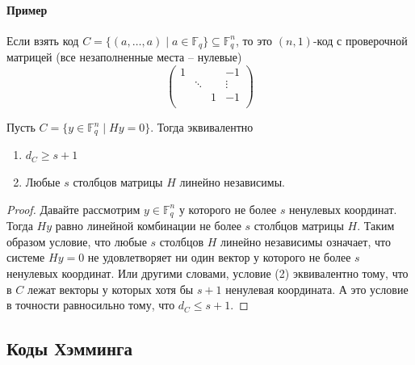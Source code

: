\paragraph{Пример}

Если взять код $C = \{(a, \ldots, a) \mid a\in \mathbb F_q\}\subseteq \mathbb F_q^n$, то это $(n, 1)$-код с проверочной матрицей (все незаполненные места -- нулевые)
\[
\begin{pmatrix}
{1}&{}&{}&{-1}\\
{}&{\ddots}&{}&{\vdots}\\
{}&{}&{1}&{-1}\\
\end{pmatrix}
\]

\begin{claim}
\label{claim::LinearCodeMinDistInTermOfMatrix}
Пусть $C = \{y\in \mathbb F_q^n\mid Hy = 0\}$.
Тогда эквивалентно
\begin{enumerate}
\item $d_C \geqslant s + 1$

\item Любые $s$ столбцов матрицы $H$ линейно независимы.
\end{enumerate}
\end{claim}
\begin{proof}
Давайте рассмотрим $y\in \mathbb F_q^n$ у которого не более $s$ ненулевых координат.
Тогда $Hy$ равно линейной комбинации не более $s$ столбцов матрицы $H$.
Таким образом условие, что любые $s$ столбцов $H$ линейно независимы означает, что системе $Hy = 0$ не удовлетворяет ни один вектор у которого не более $s$ ненулевых координат.
Или другими словами, условие (2) эквивалентно тому, что в $C$ лежат векторы у которых хотя бы $s+1$ ненулевая координата.
А это условие в точности равносильно тому, что $d_C \leqslant s+1$.
\end{proof}

\subsection{Коды Хэмминга}
\label{section::HammingCodes}

